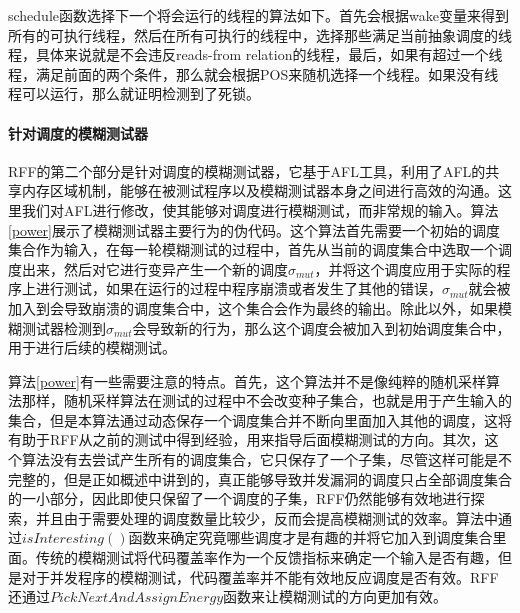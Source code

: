 schedule函数选择下一个将会运行的线程的算法如下。首先会根据wake变量来得到所有的可执行线程，然后在所有可执行的线程中，选择那些满足当前抽象调度的线程，具体来说就是不会违反reads-from relation的线程，最后，如果有超过一个线程，满足前面的两个条件，那么就会根据POS来随机选择一个线程。如果没有线程可以运行，那么就证明检测到了死锁。

\paragraph{针对调度的模糊测试器}RFF的第二个部分是针对调度的模糊测试器，它基于AFL工具，利用了AFL的共享内存区域机制，能够在被测试程序以及模糊测试器本身之间进行高效的沟通。这里我们对AFL进行修改，使其能够对调度进行模糊测试，而非常规的输入。算法\ref{power}展示了模糊测试器主要行为的伪代码。这个算法首先需要一个初始的调度集合作为输入，在每一轮模糊测试的过程中，首先从当前的调度集合中选取一个调度出来，然后对它进行变异产生一个新的调度$\sigma_{mut}$，并将这个调度应用于实际的程序上进行测试，如果在运行的过程中程序崩溃或者发生了其他的错误，$\sigma_{mut}$就会被加入到会导致崩溃的调度集合中，这个集合会作为最终的输出。除此以外，如果模糊测试器检测到$\sigma_{mut}$会导致新的行为，那么这个调度会被加入到初始调度集合中，用于进行后续的模糊测试。

算法\ref{power}有一些需要注意的特点。首先，这个算法并不是像纯粹的随机采样算法那样，随机采样算法在测试的过程中不会改变种子集合，也就是用于产生输入的集合，但是本算法通过动态保存一个调度集合并不断向里面加入其他的调度，这将有助于RFF从之前的测试中得到经验，用来指导后面模糊测试的方向。其次，这个算法没有去尝试产生所有的调度集合，它只保存了一个子集，尽管这样可能是不完整的，但是正如概述中讲到的，真正能够导致并发漏洞的调度只占全部调度集合的一小部分，因此即使只保留了一个调度的子集，RFF仍然能够有效地进行探索，并且由于需要处理的调度数量比较少，反而会提高模糊测试的效率。算法中通过$isInteresting()$函数来确定究竟哪些调度才是有趣的并将它加入到调度集合里面。传统的模糊测试将代码覆盖率作为一个反馈指标来确定一个输入是否有趣，但是对于并发程序的模糊测试，代码覆盖率并不能有效地反应调度是否有效。RFF还通过$PickNextAndAssignEnergy$函数来让模糊测试的方向更加有效。

